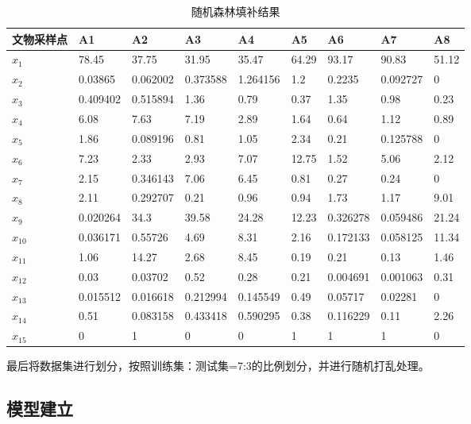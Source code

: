 \documentclass[UTF8]{ctexart}
\begin{document}
\begin{table}[H]
    \centering
	\caption{随机森林填补结果}
    \begin{tabular}{|l|l|l|l|l|l|l|l|l|}
		
    \hline
        文物采样点 & A1 & A2 & A3 & A4 & A5 & A6 & A7 & A8 \\ \hline
        $x_1$ & 78.45 & 37.75 & 31.95 & 35.47 & 64.29 & 93.17 & 90.83 & 51.12 \\ \hline
        $x_2$ & 0.03865 & 0.062002 & 0.373588 & 1.264156 & 1.2 & 0.2235 & 0.092727 & 0 \\ \hline
        $x_3$ & 0.409402 & 0.515894 & 1.36 & 0.79 & 0.37 & 1.35 & 0.98 & 0.23 \\ \hline
        $x_4$ & 6.08 & 7.63 & 7.19 & 2.89 & 1.64 & 0.64 & 1.12 & 0.89 \\ \hline
        $x_5$ & 1.86 & 0.089196 & 0.81 & 1.05 & 2.34 & 0.21 & 0.125788 & 0 \\ \hline
        $x_6$ & 7.23 & 2.33 & 2.93 & 7.07 & 12.75 & 1.52 & 5.06 & 2.12 \\ \hline
        $x_7$ & 2.15 & 0.346143 & 7.06 & 6.45 & 0.81 & 0.27 & 0.24 & 0 \\ \hline
        $x_8$ & 2.11 & 0.292707 & 0.21 & 0.96 & 0.94 & 1.73 & 1.17 & 9.01 \\ \hline
        $x_9 $& 0.020264 & 34.3 & 39.58 & 24.28 & 12.23 & 0.326278 & 0.059486 & 21.24 \\ \hline
        $x_{10}$ & 0.036171 & 0.55726 & 4.69 & 8.31 & 2.16 & 0.172133 & 0.058125 & 11.34 \\ \hline
        $x_{11}$ & 1.06 & 14.27 & 2.68 & 8.45 & 0.19 & 0.21 & 0.13 & 1.46 \\ \hline
        $x_{12}$ & 0.03 & 0.03702 & 0.52 & 0.28 & 0.21 & 0.004691 & 0.001063 & 0.31 \\ \hline
        $x_{13}$ & 0.015512 & 0.016618 & 0.212994 & 0.145549 & 0.49 & 0.05717 & 0.02281 & 0 \\ \hline
        $x_{14}$ & 0.51 & 0.083158 & 0.433418 & 0.590295 & 0.38 & 0.116229 & 0.11 & 2.26 \\ \hline
        $x_{15}$ & 0 & 1 & 0 & 0 & 1 & 1 & 1 & 0 \\ \hline
    \end{tabular}
\end{table}

最后将数据集进行划分，按照训练集：测试集=7:3的比例划分，并进行随机打乱处理。

\subsection{模型建立}
\end{document}
